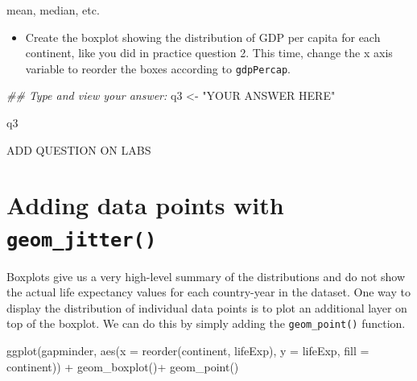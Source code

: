 \documentclass[
  letterpaper,
  DIV=11,
  numbers=noendperiod]{scrreprt}
\newenvironment{Shaded}{\begin{snugshade}}{\end{snugshade}}
\newcommand{\AttributeTok}[1]{\textcolor[rgb]{0.40,0.45,0.13}{#1}}
\newcommand{\DocumentationTok}[1]{\textcolor[rgb]{0.37,0.37,0.37}{\textit{#1}}}
\newcommand{\FunctionTok}[1]{\textcolor[rgb]{0.28,0.35,0.67}{#1}}
\newcommand{\NormalTok}[1]{\textcolor[rgb]{0.00,0.23,0.31}{#1}}
\newcommand{\OtherTok}[1]{\textcolor[rgb]{0.00,0.23,0.31}{#1}}
\newcommand{\SpecialCharTok}[1]{\textcolor[rgb]{0.37,0.37,0.37}{#1}}
\newcommand{\StringTok}[1]{\textcolor[rgb]{0.13,0.47,0.30}{#1}}
\providecommand{\tightlist}{%
  \setlength{\itemsep}{0pt}\setlength{\parskip}{0pt}}\usepackage{longtable,booktabs,array}
\begin{document}
mean, median, etc.

\begin{tcolorbox}[enhanced jigsaw, colframe=quarto-callout-tip-color-frame, colbacktitle=quarto-callout-tip-color!10!white, titlerule=0mm, opacitybacktitle=0.6, breakable, toprule=.15mm, arc=.35mm, rightrule=.15mm, colback=white, bottomrule=.15mm, opacityback=0, toptitle=1mm, left=2mm, bottomtitle=1mm, title=\textcolor{quarto-callout-tip-color}{\faLightbulb}\hspace{0.5em}{Practice}, leftrule=.75mm, coltitle=black]

\begin{itemize}
\tightlist
\item
  Create the boxplot showing the distribution of GDP per capita for each
  continent, like you did in practice question 2. This time, change the
  x axis variable to reorder the boxes according to \texttt{gdpPercap}.
\end{itemize}

\begin{Shaded}
\begin{Highlighting}[]
\DocumentationTok{\#\# Type and view your answer:}
\NormalTok{q3 }\OtherTok{\textless{}{-}} \StringTok{"YOUR ANSWER HERE"} 
  
\NormalTok{q3}
\end{Highlighting}
\end{Shaded}

ADD QUESTION ON LABS

\end{tcolorbox}

\hypertarget{adding-data-points-with-geom_jitter}{%
\section{\texorpdfstring{Adding data points with
\texttt{geom\_jitter()}}{Adding data points with geom\_jitter()}}\label{adding-data-points-with-geom_jitter}}

Boxplots give us a very high-level summary of the distributions and do
not show the actual life expectancy values for each country-year in the
dataset. One way to display the distribution of individual data points
is to plot an additional layer on top of the boxplot. We can do this by
simply adding the \texttt{geom\_point()} function.

\begin{Shaded}
\begin{Highlighting}[]
\FunctionTok{ggplot}\NormalTok{(gapminder, }
       \FunctionTok{aes}\NormalTok{(}\AttributeTok{x =} \FunctionTok{reorder}\NormalTok{(continent, lifeExp), }
           \AttributeTok{y =}\NormalTok{ lifeExp,}
           \AttributeTok{fill =}\NormalTok{ continent)) }\SpecialCharTok{+}
      \FunctionTok{geom\_boxplot}\NormalTok{()}\SpecialCharTok{+}
      \FunctionTok{geom\_point}\NormalTok{()}
\end{Highlighting}
\end{Shaded}
\end{document}
